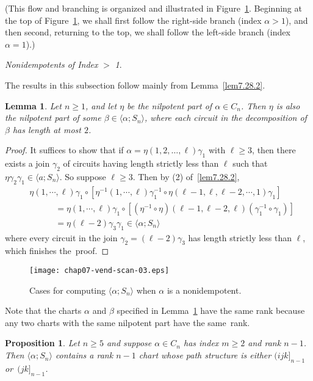 \documentclass{surv-l}
\numberwithin{equation}{section}
\numberwithin{table}{section}
\numberwithin{figure}{section}
\theoremstyle{plain}
\newtheorem{lemma}[equation]{Lemma}
\newtheorem{proposition}[equation]{Proposition}
\theoremstyle{definition}
\begin{document}
(This flow and branching is organized and illustrated in
Figure~\ref{fig7.32.2}. Beginning at the top of
Figure~\ref{fig7.32.2}, we shall first follow the right-side
branch (index $\alpha>1$), and then second, returning to the top,
we shall follow the left-side branch (index $\alpha=1$).)

\emph{Nonidempotents of Index} $>$ \emph{1}.

The results in this subsection follow mainly from
Lemma~\ref{lem7.28.2}.

\begin{lemma}\label{lem7.32.1}
Let $n \geq 1$, and let $\eta$ be the nilpotent part of $\alpha\in
C_{n}$. Then $\eta$ is also the nilpotent part of some
$\beta\in\langle\alpha;S_{n}\rangle$, where each circuit in the
decomposition of $\beta$ has length at most $2$.
\end{lemma}

\begin{proof} It suffices to show that if $\alpha=\eta(1,2,\ldots,
\ell)\gamma_{1}$ with $\ell\geq 3$, then there exists a join
$\gamma_{2}$ of circuits having length strictly less than $\ell$ such
that $\eta\gamma_{2}\gamma_{1}\in\langle a;S_{n}\rangle$. So
suppose $\ell\geq 3$. Then by (2) of~\ref{lem7.28.2},
\begin{align*}
&\eta(1,\cdots,\ell)\gamma_{1}\circ [\eta^{-1}(1,\cdots,
\ell)\gamma_{1}^{-1}\circ\eta(\ell-1, \ell, \ell-2, \cdots,1)\gamma_{1}]\\
&\qquad\quad =\eta(1, \cdots, \ell)\gamma_{1}\circ [(\eta^{-1}\circ\eta)(\ell-1, \ell-2, \ell)(\gamma_{1}^{-1}\circ\gamma_{1})] \\
&\qquad\quad =\eta(\ell-2)\gamma_{3}\gamma_{1}\in\langle\alpha;S_{n}\rangle
\end{align*}
where every circuit in the join $\gamma_{2}=(\ell-2)\gamma_{3}$
has length strictly less than $\ell$, which finishes the~proof.
\end{proof}

\setcounter{figure}{1}
\begin{figure}[!h]
\texttt{[image: chap07-vend-scan-03.eps]}
\caption{Cases for computing $\langle\alpha;S_{n}\rangle$ when $\alpha$ is
a nonidempotent.}\label{fig7.32.2}
\end{figure}

Note that the charts $\alpha$ and $\beta$ specified in
Lemma~\ref{lem7.32.1} have the same rank because any two charts
with the same nilpotent part have the same~rank.

\setcounter{equation}{2}
\begin{proposition}\label{prop7.32.3}
Let $n\geq 5$ and suppose $\alpha\in C_{n}$ has index $m\geq 2$
and rank $n -1$. Then $\langle\alpha;S_{n}\rangle$ contains a rank
$n-1$ chart whose path structure is either $(ijk]_{n-1}$
or~$(jk]_{n-1}$.
\end{proposition}
\end{document}
